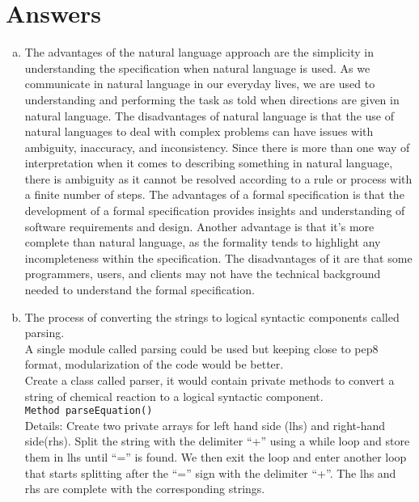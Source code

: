 \documentclass[12pt]{article}
\begin{document}
\newpage

\section{Answers}

\begin{enumerate}[a)]

\item The advantages of the natural language approach are the simplicity in understanding the specification when natural language is used. As we communicate in natural language in our everyday lives, we are used to understanding and performing the task as told when directions are given in natural language. The disadvantages of natural language is that the use of natural languages to deal with complex problems can have issues with ambiguity, inaccuracy, and inconsistency. Since there is more than one way of interpretation when it comes to describing something in natural language, there is ambiguity as it cannot be resolved according to a rule or process with a finite number of steps. The advantages of a formal specification is that the development of a formal specification provides insights and understanding of software requirements and design. Another advantage is that it’s more complete than natural language, as the formality tends to highlight any incompleteness within the specification. The disadvantages of it are that some programmers, users, and clients may not have the technical background needed to understand the formal specification.

\item The process of converting the strings to logical syntactic components called parsing.\\
A single module called parsing could be used but keeping close to pep8 format, modularization of the code would be better.\\

Create a class called parser, it would contain private methods to convert a string of chemical reaction to a logical syntactic component.\\

\texttt{Method parseEquation()}\\
Details: Create two private arrays for left hand side (lhs) and right-hand side(rhs). Split the string with the delimiter “+” using a while loop and store them in lhs until “=” is found. We then exit the loop and enter another loop that starts splitting after the “=” sign with the delimiter “+”. The lhs and rhs are complete with the corresponding strings. \\


\end{enumerate}
\end{document}
